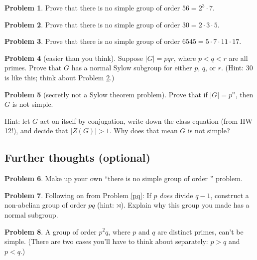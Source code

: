 \documentclass[12pt]{article}
\theoremstyle{definition} %
\newtheorem{problem}{Problem}
\begin{document}
\begin{problem}
  Prove that there is no simple group of order $56 = 2^3 \cdot 7$.
\end{problem}

\begin{problem}\label{30}
  Prove that there is no simple group of order $30 = 2\cdot 3 \cdot 5$.
\end{problem}

\begin{problem}
  Prove that there is no simple group of order $6545 = 5\cdot 7 \cdot 11 \cdot 17$.
\end{problem}

\begin{problem}[easier than you think]
  Suppose $|G| = pqr$, where $p<q<r$ are all primes. Prove that $G$ has a normal Sylow subgroup for either $p$, $q$, or $r$. (Hint: $30$ is like this; think about Problem \ref{30}.)
\end{problem}

\begin{problem}[secretly not a Sylow theorem problem]
  Prove that if $|G| = p^n$, then $G$ is not simple. 
  
  Hint: let $G$ act on itself by conjugation, write down the class equation (from HW 12!), and decide that $|Z(G)| > 1$. Why does that mean $G$ is not simple?
\end{problem}

\subsection*{Further thoughts (optional)}

\begin{problem}
  Make up your own ``there is no simple group of order \underline{\quad}'' problem.
\end{problem}

\begin{problem}
  Following on from Problem \ref{pq}: If $p$ \textit{does} divide $q-1$, construct a non-abelian group of order $pq$ (hint: $\rtimes$). Explain why this group you made has a normal subgroup.
\end{problem}

\begin{problem}
  A group of order $p^2q$, where $p$ and $q$ are distinct primes, can't be simple. (There are two cases you'll have to think about separately: $p>q$ and $p<q$.)
\end{problem}
\end{document}
